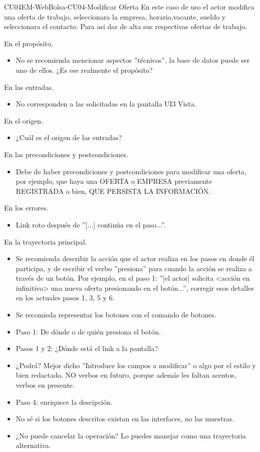 \begin{UseCase}{CU04}{EM-WebBolsa-CU04-Modificar Oferta}{
		En este caso de uso el actor  modifica una oferta de trabajo, seleccionara la empresa, horario,vacante, sueldo y seleccionara el contacto. Para asi dar de alta sus respectivas ofertas de trabajo.}
{			En el propósito.
			\begin{itemize}
				\item No se recomienda mencionar aspectos ''técnicos'', la base de datos puede ser uno de ellos. ¿Es ese realmente el propósito?
			\end{itemize}

			En las entradas.
			\begin{itemize}
				\item No corresponden a las solicitadas en la pantalla UI3 Vista.
			\end{itemize}

			En el origen.
			\begin{itemize}
				\item ¿Cuál es el origen de las entradas?
			\end{itemize}

			En las precondiciones y postcondiciones. 
			\begin{itemize}
				\item Debe de haber precondiciones y postcondiciones para modificar una oferta, por ejemplo, que haya una OFERTA o EMPRESA previamente REGISTRADA o bien, QUE PERSISTA LA INFORMACIÓN.
			\end{itemize}

			En los errores. 
			\begin{itemize}
				\item Link roto después de ''[...] continúa en el paso...''.
			\end{itemize}

			En la trayectoria principal. 
			\begin{itemize}
				\item Se recomienda describir la acción que el actor realiza en los pasos en donde él participa, y de escribir el verbo ''presiona'' para cuando la acción se realiza a través de un botón. Por ejemplo, en el paso 1: ''[el actor] solicita <acción en infinitivo> una nueva oferta presionando en el botón...'', corregir esos detalles en los actuales pasos 1, 3, 5 y 6.
				\item Se recomieda representar los botones con el comando de botones.
				\item Paso 1: De dónde o de quién presiona el botón.
				\item Pasos 1 y 2: ¿Dónde está el link a la pantalla? 
				\item ¿Podrá? Mejor dicho ''Introduce los campos a modificar'' o algo por el estilo y bien redactado. NO verbos en futuro, porque además les faltan acentos, verbos en presente. 
				\item Paso 4: enriquece la descipción. 
				\item No sé si los botones descritos existan en las interfaces, no las muestras.
				\item ¿No puede cancelar la operación? Lo puedes manejar como una trayectoria alternativa.
			\end{itemize}
		
}
\end{UseCase}
